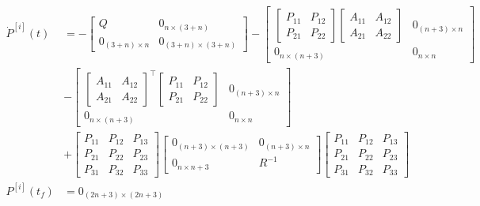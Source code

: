 \documentclass[3p,times]{article}
\begin{document}
\begin{align}
\dot{P}^{[i]}(t) &= -\begin{bmatrix}
Q & 0_{n\times (3+n)} \\ 0_{(3+n)\times n} & 0_{(3+n)\times (3+n)}
\end{bmatrix}
-\begin{bmatrix}\begin{bmatrix}
P_{11} & P_{12} \\
P_{21} & P_{22}
\end{bmatrix}\begin{bmatrix}
A_{11} & A_{12} \\ A_{21} & A_{22} 
\end{bmatrix}   & 0_{(n+3)\times n} \\ 
0_{n \times (n+3)} & 0_{n \times n}\end{bmatrix} \\
&-\begin{bmatrix} \begin{bmatrix}
A_{11} & A_{12} \\ A_{21} & A_{22} 
\end{bmatrix}^{\top}\begin{bmatrix}
P_{11} & P_{12} \\
P_{21} & P_{22}
\end{bmatrix}  & 0_{(n+3)\times n} \\ 
0_{n \times (n+3)} & 0_{n \times n}\end{bmatrix}\\ 
&+\begin{bmatrix}
P_{11} & P_{12} & P_{13} \\
P_{21} & P_{22} & P_{23} \\
P_{31} & P_{32} & P_{33}
\end{bmatrix}
\begin{bmatrix} 0_{(n+3) \times (n+3)} & 0_{(n+3) \times n} \\ 0_{n \times n+3} & R^{-1 }
\end{bmatrix}\begin{bmatrix}
P_{11} & P_{12} & P_{13} \\
P_{21} & P_{22} & P_{23} \\
P_{31} & P_{32} & P_{33}
\end{bmatrix}
 \\
P^{[i]}(t_f) &= 0_{(2n+3)\times(2n+3)}
\end{align}
\end{document}
